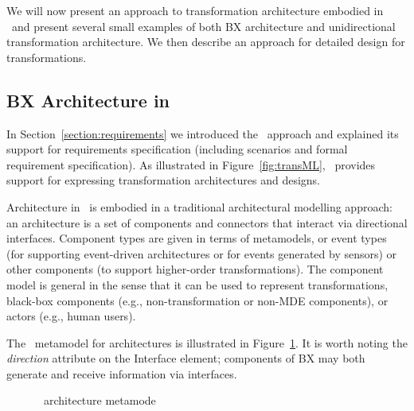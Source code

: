 We will now present an approach to transformation architecture embodied in \transml\  and present several small examples of both BX architecture and unidirectional transformation architecture. We then describe an approach for detailed design for transformations.

\subsection{BX Architecture in \transml\ }
In Section~\ref{section:requirements} we introduced the \transml\ approach and explained its support for requirements specification (including scenarios and formal requirement specification). As illustrated  in Figure~\ref{fig:transML}, \transml\ provides support for expressing transformation architectures and designs. 

Architecture in \transml\ is embodied in a traditional architectural modelling approach: an architecture is a set of components and connectors that interact via directional interfaces. Component types are given in terms of metamodels, or event types (for supporting event-driven architectures or for events generated by sensors) or other components (to support higher-order transformations). The component model is general in the sense that it can be used to represent transformations, black-box components (e.g., non-transformation or non-MDE components), or actors (e.g., human users). 

The \transml\ metamodel for architectures is illustrated in Figure~\ref{fig:transml-architecture}. It is worth noting the \textit{direction} attribute on the Interface element; components of BX may both generate and receive  information via interfaces.

\begin{figure}[htbp]
\caption{\transml\ architecture metamode \cite{GuerraLKPS13}}
\label{fig:transml-architecture}
\end{figure}

